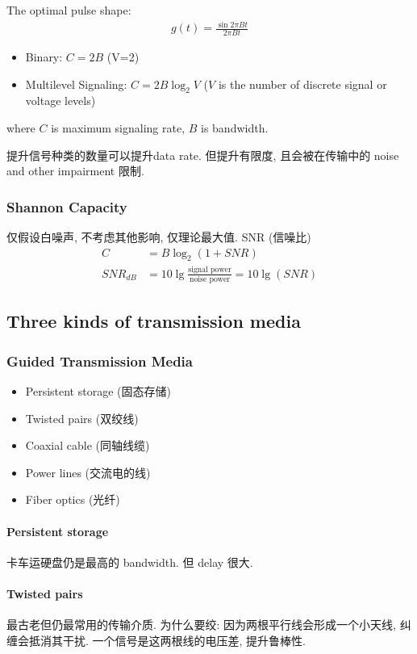 The optimal pulse shape: %
\begin{align*}
    g(t)=\frac{\sin 2\pi Bt}{2\pi Bt}
\end{align*}
\begin{itemize}
    \item Binary: \textcolor{light_red}{$C = 2B$} (V=2)
    \item Multilevel Signaling: \textcolor{light_red}{$C = 2B \log_2 V$} ($V$ is the number of discrete signal or voltage levels)
\end{itemize}
where $C$ is maximum signaling rate, $B$ is bandwidth. 

提升信号种类的数量可以提升data rate. 但提升有限度, 且会被在传输中的 noise and other impairment 限制. 

\subsubsection{Shannon Capacity}
仅假设白噪声, 不考虑其他影响, 仅理论最大值. SNR (信噪比)
\begin{align*}
    C&=B\log_2 (1+SNR)\\
    SNR_{dB}&=10\lg\frac{\text{signal power}}{\text{noise power}}=10\lg(SNR)
\end{align*}

\subsection{Three kinds of transmission media}
\subsubsection{Guided Transmission Media}
\begin{itemize}
    \item Persistent storage (固态存储)
    \item Twisted pairs (双绞线)
    \item Coaxial cable (同轴线缆)
    \item Power lines (交流电的线)
    \item Fiber optics (光纤)
\end{itemize}

\paragraph{Persistent storage} 卡车运硬盘仍是最高的 bandwidth. 但 delay 很大. 

\paragraph{Twisted pairs} 最古老但仍最常用的传输介质. 为什么要绞: 因为两根平行线会形成一个小天线, 纠缠会抵消其干扰. 一个信号是这两根线的电压差, 提升鲁棒性. 

